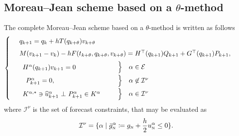 \subsection{Moreau--Jean scheme based on a  $\theta$-method}
The complete Moreau--Jean scheme based on a  $\theta$-method is written as follows
 \begin{equation}
    \label{eq:Moreau--Jean-theta}
    \begin{cases}
      ~~\begin{array}{l}
        q_{k+1} = q_{k} + h T(q_{k+\theta}) v_{k+\theta} \quad \\[1ex]
        M(v_{k+1}-v_k) - h  F(t_{k+\theta}, q_{k+\theta},v_{k+\theta}) =  H^\top(q_{k+1}) Q_{k+1} + G^\top(q_{k+1}) P_{k+1},\quad\,\\[1ex]
      \end{array}\\
      ~~\begin{array}{lcl}
        \begin{array}{l}
          H^\alpha(q_{k+1}) v_{k+1}  =  0\\
        \end{array} & \left. \begin{array}{l}
          \vphantom{H^\alpha(q_{k+1}) v_{k+1}  =  0}\\[1ex]
        \end{array}\right\}    &\alpha \in \mathcal E  \\[1ex]
      ~~~P_{k+1}^\alpha= 0, &
      \left. \begin{array}{l}
          \vphantom{P_{k+1}^\alpha= 0,  \delta^\alpha_{k+1}=0}\\[1ex]
        \end{array}\right\}   & \alpha \not\in \mathcal I^\nu \\[1ex]
      \begin{array}{l}
          {K}^{\alpha,*} \ni \widehat u_{k+1}^\alpha~ \bot~ P_{k+1}^\alpha \in {K}^\alpha \\
      \end{array} &
      \left.\begin{array}{l}
          \vphantom{{K}^{\alpha,*} \ni \widehat u_{k+1}^\alpha~ \bot~ P_{k+1}^\alpha \in {K}^\alpha} \\
        \end{array}\right\}
      &\alpha \in \mathcal I^\nu\\
  \end{array}
\end{cases}
\end{equation}
where $\mathcal I^\nu$ is the set of forecast constraints, that may be evaluated as
\begin{equation}
  \label{eq:10}
  \mathcal I^\nu = \{\alpha \mid \bar g_{\hbox{\tiny{N}}}^\alpha \coloneqq g_{\hbox{\tiny{N}}} + \frac h 2 u^\alpha_{\hbox{\tiny{N}}} \leq 0\}.
\end{equation}


